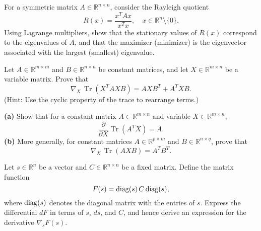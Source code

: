\begin{exercise}
   For a symmetric matrix $A\in\mathbb{R}^{n\times n}$, consider the Rayleigh quotient
   \[
      R(x) = \frac{x^T A x}{x^T x}, \quad x\in\mathbb{R}^n\setminus\{0\}.
   \]
   Using Lagrange multipliers, show that the stationary values of $R(x)$ correspond to the eigenvalues of $A$, and that the maximizer (minimizer) is the eigenvector associated with the largest (smallest) eigenvalue.
\end{exercise}
\begin{exercise}
   Let $A\in\mathbb{R}^{m\times m}$ and $B\in\mathbb{R}^{n\times n}$ be constant matrices, and let $X\in\mathbb{R}^{m\times n}$ be a variable matrix. Prove that
   \[
      \nabla_X\,\operatorname{Tr}(X^T A X B) = A X B^T + A^T X B.
   \]
   (Hint: Use the cyclic property of the trace to rearrange terms.)
\end{exercise}

\begin{exercise}
   \textbf{(a)} Show that for a constant matrix $A\in\mathbb{R}^{m\times n}$ and variable $X\in\mathbb{R}^{m\times n}$,
   \[
      \frac{\partial}{\partial X} \operatorname{Tr}(A^T X) = A.
   \]
   \textbf{(b)} More generally, for constant matrices $A\in\mathbb{R}^{p\times m}$ and $B\in\mathbb{R}^{n\times q}$, prove that
   \[
      \nabla_X\,\operatorname{Tr}(A X B) = A^T B^T.
   \]
\end{exercise}

\begin{exercise}
   Let $s\in\mathbb{R}^n$ be a vector and $C\in\mathbb{R}^{n\times n}$ be a fixed matrix. Define the matrix function 
   \[
      F(s) = \mathrm{diag}(s)\,C\,\mathrm{diag}(s),
   \]
   where $\mathrm{diag}(s)$ denotes the diagonal matrix with the entries of $s$. Express the differential $dF$ in terms of $s$, $ds$, and $C$, and hence derive an expression for the derivative $\nabla_s F(s)$.
\end{exercise}

